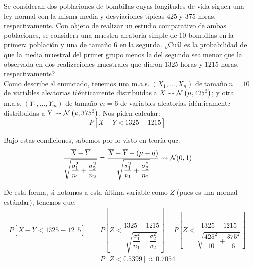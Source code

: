 \begin{ejercicio}
    Se consideran dos poblaciones de bombillas cuyas longitudes de vida siguen una ley normal con la misma media y desviaciones típicas $425$ y $375$ horas, respectivamente.  Con objeto de realizar un estudio comparativo de ambas poblaciones, se considera una muestra aleatoria simple de $10$ bombillas en la primera población y una de tamaño 6 en la segunda. ¿Cuál es la probabilidad de que la media muestral del primer grupo menos la del segundo sea menor que la observada en dos realizaciones muestrales que dieron $1325$ horas y $1215$ horas, respectivamente?\\

    \noindent
    Como describe el enunciado, tenemos una m.a.s. $(X_1, \ldots, X_n)$ de tamaño $n=10$ de variables aleatorias idénticamente distribuidas a $X\rightsquigarrow\mathcal{N}\left(\mu, {425}^{2}\right)$; y otra m.a.s. $(Y_1, \ldots, Y_m)$ de tamaño $m=6$ de variables aleatorias idénticamente distribuidas a $Y\rightsquigarrow\mathcal{N}\left(\mu, {375}^{2}\right)$. Nos piden calcular:
    \begin{equation*}
        P[\overline{X}-\overline{Y}<1325-1215]
    \end{equation*}
    
    
    Bajo estas condiciones, sabemos por lo visto en teoría que:
    \begin{equation*}
        \dfrac{\overline{X}-\overline{Y}}{\sqrt{\dfrac{\sigma_1^2}{n_1}+\dfrac{\sigma_2^2}{n_2}}} = \dfrac{\overline{X}-\overline{Y}-(\mu - \mu)}{\sqrt{\dfrac{\sigma_1^2}{n_1}+\dfrac{\sigma_2^2}{n_2}}}  \rightsquigarrow \mathcal{N}(0,1)
    \end{equation*}

    De esta forma, si notamos a esta última variable como $Z$ (pues es una normal estándar), tenemos que:
    \begin{align*}
        P[\overline{X}-\overline{Y}<1325-1215] &= P\left[Z < \dfrac{1325-1215}{\sqrt{\dfrac{\sigma_1^2}{n_1}+\dfrac{\sigma_2^2}{n_2}}}\right] = P\left[Z <  \dfrac{1325-1215}{\sqrt{\dfrac{{425}^{2}}{10}+\dfrac{{375}^{2}}{6}}}\right] \\
                                               &= P[Z<0.5399] \approx 0.7054
    \end{align*}
\end{ejercicio}


